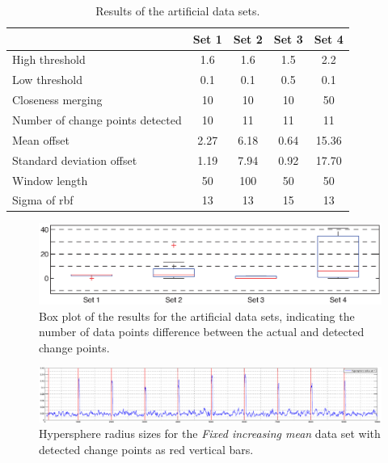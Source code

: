 \begin{table}
  \centering
  \begin{tabulary}{\textwidth}{|l|c|c|c|c|}
     & Set 1 & Set 2 & Set 3 & Set 4 \\
    \hline
    High threshold & 1.6 & 1.6 & 1.5 & 2.2 \\
    \hline
    Low threshold & 0.1 & 0.1 & 0.5 & 0.1 \\
    \hline
    Closeness merging & 10 & 10 & 10 & 50 \\
    \hline
    Number of change points detected & 10 & 11 & 11 & 11 \\
    \hline
    Mean offset & 2.27 & 6.18 & 0.64 & 15.36 \\
    \hline
    Standard deviation offset & 1.19 & 7.94 & 0.92 & 17.70 \\
    \hline
    Window length & 50 & 100 & 50 & 50 \\
    \hline
    Sigma of \gls{rbf} & 13 & 13 & 15 & 13 \\
    \hline
  \end{tabulary}
  \caption[Results artificial data sets]{Results of the artificial data sets.}
  \label{tab:results_artificial}
\end{table}

\begin{figure}
\centering
  \includegraphics[width=1\textwidth]{./Figures/chapter5/boxplot_results_artificial_sets.eps}
  \caption[Box plot results artificial data sets]{Box plot of the results for the artificial data sets, indicating the number of data points difference between the actual and detected change points.}
  \label{fig:boxplot_artificial_sets}
\end{figure}

\begin{figure}
\centering
  \includegraphics[width=1\textwidth]{./Figures/chapter5/set_1_results.eps}
  \caption[Fixed increasing mean, thresholds]{Hypersphere radius sizes for the \emph{Fixed increasing mean} data set with detected change points as red vertical bars.}
  \label{fig:camci_fixed_increasing_mean_thresholds}
\end{figure}

